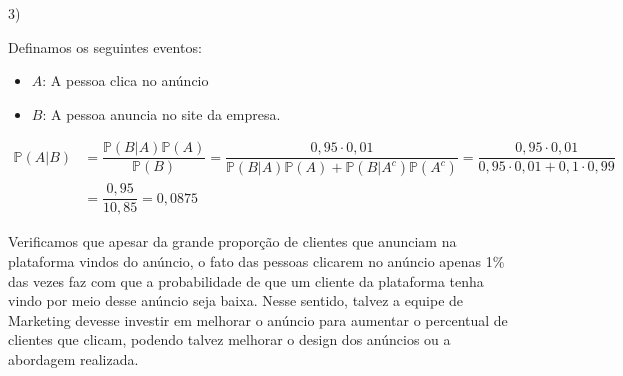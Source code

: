 \documentclass[12pt]{article}
\begin{document}
\vspace{5px}

3) 

Definamos os seguintes eventos:

\begin{itemize}
    \item $A$: A pessoa clica no anúncio
    \item $B$: A pessoa anuncia no site da empresa. 
\end{itemize}

\begin{align*}
    \mathds{P}(A|B) &= \dfrac{\mathds{P}(B|A)\mathds{P}(A)}{\mathds{P}(B)} = \dfrac{0,95 \cdot 0,01}{\mathds{P}(B|A)\mathds{P}(A) + \mathds{P}(B|A^c)\mathds{P}(A^c) }
    = \dfrac{0,95 \cdot 0,01}{0,95 \cdot 0,01 + 0,1 \cdot 0,99}\\
    &= \dfrac{0,95}{10,85} = 0,0875
\end{align*}

Verificamos que apesar da grande proporção de clientes que anunciam na plataforma vindos do anúncio, o fato das pessoas clicarem no anúncio apenas 1\% das vezes faz com que a probabilidade de que 
um cliente da plataforma tenha vindo por meio desse anúncio seja baixa. Nesse sentido, talvez a equipe de Marketing devesse investir em melhorar o anúncio 
para aumentar o percentual de clientes que clicam, podendo talvez melhorar o design dos anúncios ou a abordagem realizada. 

\vspace{5px}
\end{document}

